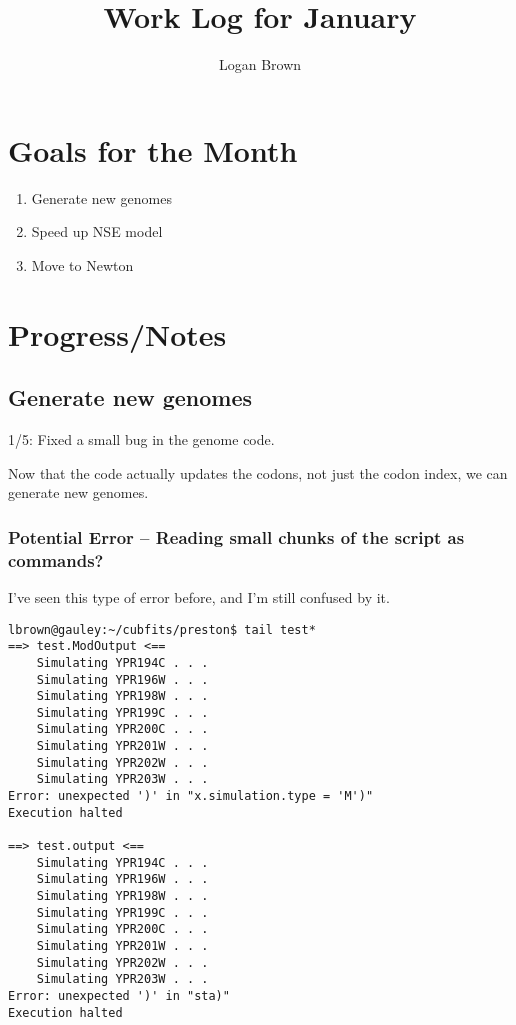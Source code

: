 

\title{Work Log for January}
\author{Logan Brown}


\maketitle
\tableofcontents

\newpage


\section{Goals for the Month}
\begin{enumerate}
\item Generate new genomes
\item Speed up NSE model
\item Move to Newton
\end{enumerate}

\section{Progress/Notes}

\subsection{Generate new genomes}

1/5: Fixed a small bug in the genome code.

Now that the code actually updates the codons, not just the codon index, we can generate new genomes.

\subsubsection{Potential Error -- Reading small chunks of the script as commands?}

I've seen this type of error before, and I'm still confused by it.

\begin{verbatim}
lbrown@gauley:~/cubfits/preston$ tail test*
==> test.ModOutput <==
	Simulating YPR194C . . .
	Simulating YPR196W . . .
	Simulating YPR198W . . .
	Simulating YPR199C . . .
	Simulating YPR200C . . .
	Simulating YPR201W . . .
	Simulating YPR202W . . .
	Simulating YPR203W . . .
Error: unexpected ')' in "x.simulation.type = 'M')"
Execution halted

==> test.output <==
	Simulating YPR194C . . .
	Simulating YPR196W . . .
	Simulating YPR198W . . .
	Simulating YPR199C . . .
	Simulating YPR200C . . .
	Simulating YPR201W . . .
	Simulating YPR202W . . .
	Simulating YPR203W . . .
Error: unexpected ')' in "sta)"
Execution halted
\end{verbatim}

